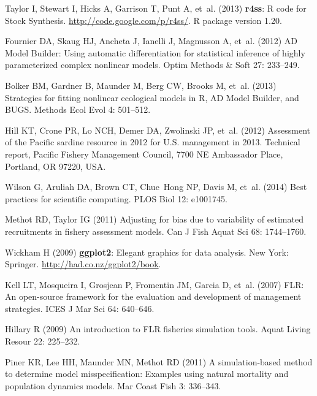 \documentclass[10pt]{article}
\begin{document}
\begin{thebibliography}{10}
Taylor I, Stewart I, Hicks A, Garrison T, Punt A, et~al. (2013) \textbf{r4ss}:
  \textsf{R} code for Stock Synthesis.
\newblock \urlprefix\url{http://code.google.com/p/r4ss/}.
\newblock \textsf{R} package version 1.20.

Fournier DA, Skaug HJ, Ancheta J, Ianelli J, Magnusson A, et~al. (2012) {AD
  Model Builder}: Using automatic differentiation for statistical inference of
  highly parameterized complex nonlinear models.
\newblock Optim Methods \& Soft 27: 233--249.

Bolker BM, Gardner B, Maunder M, Berg CW, Brooks M, et~al. (2013) Strategies
  for fitting nonlinear ecological models in {R}, {AD Model Builder}, and
  {BUGS}.
\newblock Methods Ecol Evol 4: 501--512.

Hill KT, Crone PR, Lo NCH, Demer DA, Zwolinski JP, et~al. (2012) Assessment of
  the {Pacific} sardine resource in 2012 for {U.S.} management in 2013.
\newblock Technical report, Pacific Fishery Management Council, 7700 NE
  Ambassador Place, Portland, OR 97220, USA.

Wilson G, Aruliah DA, Brown CT, Chue~Hong NP, Davis M, et~al. (2014) Best
  practices for scientific computing.
\newblock PLOS Biol 12: e1001745.

Methot RD, Taylor IG (2011) Adjusting for bias due to variability of estimated
  recruitments in fishery assessment models.
\newblock Can J Fish Aquat Sci 68: 1744--1760.

Wickham H (2009) \textbf{ggplot2}: Elegant graphics for data analysis.
\newblock New York: Springer.
\newblock \urlprefix\url{http://had.co.nz/ggplot2/book}.

Kell LT, Mosqueira I, Grosjean P, Fromentin JM, Garcia D, et~al. (2007) {FLR}:
  An open-source framework for the evaluation and development of management
  strategies.
\newblock ICES J Mar Sci 64: 640--646.

Hillary R (2009) An introduction to {FLR} fisheries simulation tools.
\newblock Aquat Living Resour 22: 225--232.

Piner KR, Lee HH, Maunder MN, Methot RD (2011) A simulation-based method to
  determine model misspecification: Examples using natural mortality and
  population dynamics models.
\newblock Mar Coast Fish 3: 336--343.


\end{thebibliography}
\end{document}
